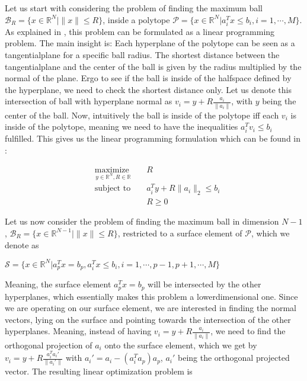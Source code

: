 \documentclass{article}
\def\R{\ensuremath{\mathbb{R}}}
\begin{document}
Let us start with considering the problem of finding the
maximum ball $\mathcal{B}_R=\{x \in \R^N | \|x\| \leq R\}$, inside a polytope
$\mathcal{P} = \{x \in \R^N| a_i^T x \leq b_i, i=1,\cdots,M\}$.  As explained in
\cite{boyd}, this problem can be formulated as a linear programming problem.
The main insight is: Each hyperplane of the polytope can be seen as a
tangentialplane for a specific ball radius. The shortest distance between the
tangentialplane and the center of the ball is given by the radius multiplied by
the normal of the plane. Ergo to see if the ball is inside of the halfspace
defined by the hyperplane, we need to check the shortest distance only. Let us
denote this intersection of ball with hyperplane normal as $v_i = y +
R\frac{a_i}{\|a_i\|}$, with $y$ being the center of the ball. Now, intuitively the ball is
inside of the polytope iff each $v_i$ is inside of the polytope, meaning we need
to have the inequalities $a_i^Tv_i \leq b_i$ fulfilled. This gives us the linear programming formulation which can be found in \cite{boyd}:

\begin{equation}
        \begin{aligned}
                &\underset{y \in \R^N, R \in \R}{\text{maximize }}&&R\\
                &\text{subject to }&& a_i^T y + R\|a_i\|_2 \leq b_i\\
                &&& R \geq 0
        \end{aligned}
\end{equation}

Let us now consider the problem of finding the maximum ball in dimension $N-1$, $\mathcal{B}_R=\{x
\in \R^{N-1} | \|x\| \leq R\}$, restricted to a surface element of $\mathcal{P}$, which we denote as
\begin{center}
$\mathcal{S} = \{x \in \R^N| a_p^Tx=b_p, a_i^T x \leq b_i, i=1,\cdots,p-1,p+1,\cdots,M\}$
\end{center}

Meaning, the surface element $a_p^Tx=b_p$ will be intersected by the other
hyperplanes, which essentially makes this problem a lowerdimensional one. Since
we are operating on our surface element, we are interested in finding the normal
vectors, lying on the surface and pointing towards the intersection of the other
hyperplanes. Meaning, instead of having $v_i = y + R\frac{a_i}{\|a_i\|}$, we
need to find the orthogonal projection of $a_i$ onto the surface element, which
we get by $v_i = y + R\frac{a_i^T a_i'}{\|a_i'\|}$ with $a_i' = a_i -
(a_i^Ta_p)a_p$, $a_i'$ being the orthogonal projected vector. The resulting
linear optimization problem is
\end{document}
